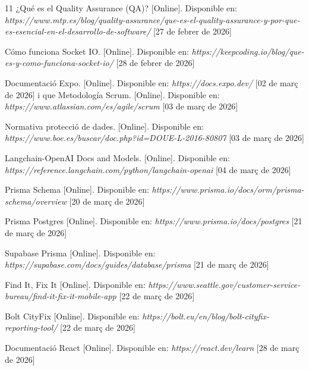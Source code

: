 \documentclass[10pt,a4paper,twocolumn,twoside]{article}
\begin{document}
		
		
		\begin{thebibliography}{11}
			¿Qué es el Quality Assurance (QA)? [Online]. Disponible en: \textit{https://www.mtp.es/blog/quality-assurance/que-es-el-quality-assurance-y-por-que-es-esencial-en-el-desarrollo-de-software/} [27 de febrer de 2026]
			
			Cómo funciona Socket IO. [Online]. Disponible en:
			\textit{https://keepcoding.io/blog/que-es-y-como-funciona-socket-io/ } [28 de febrer de 2026]
			
			Documentació Expo. [Online]. Disponible en:
			\textit{https://docs.expo.dev/ } [02 de març de 2026]
			i que 
			Metodología Scrum. [Online]. Disponible en:
			\textit{https://www.atlassian.com/es/agile/scrum } [03 de març de 2026]
			
			Normativa protecció de dades. [Online]. Disponible en:
			\textit{https://www.boe.es/buscar/doc.php?id=DOUE-L-2016-80807 } [03 de març de 2026]
			
			Langchain-OpenAI Docs and Models. [Online]. Disponible en:
			\textit{https://reference.langchain.com/python/langchain-openai} [04 de març de 2026]
			
			Prisma Schema [Online]. Disponible en:
			\textit{https://www.prisma.io/docs/orm/prisma-schema/overview} [20 de març de 2026]
			
			Prisma Postgres [Online]. Disponible en:
			\textit{https://www.prisma.io/docs/postgres} [21 de març de 2026]
			
			Supabase Prisma [Online]. Disponible en: 
			\textit{https://supabase.com/docs/guides/database/prisma} [21 de març de 2026]
			
			Find It, Fix It [Online]. Disponible en: 
			\textit{https://www.seattle.gov/customer-service-bureau/find-it-fix-it-mobile-app} [22 de març de 2026]
			
			Bolt CityFix [Online]. Disponible en: 
			\textit{https://bolt.eu/en/blog/bolt-cityfix-reporting-tool/} [22 de març de 2026]
			
			Documentació React [Online]. Disponible en: 
			\textit{https://react.dev/learn} [28 de març de 2026]
			

\end{thebibliography}
\end{document}
